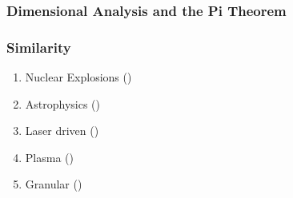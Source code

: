 %
\begin{frame}\frametitle{Dimensional Analysis and the Pi Theorem}
	
\end{frame}
%
%
\begin{frame}\frametitle{Similarity}
\begin{enumerate}
	\item Nuclear Explosions (\cite{taylor1950formationI, taylor1950formationII})
	\item Astrophysics (\cite{ostriker1988astrophysical})
	\item Laser driven (\cite{edwards2001investigation})
	\item Plasma (\cite{moore2005tailored})
	\item Granular (\cite{boudet2013unstable, boudet2009blast})
\end{enumerate}
\end{frame}
%


